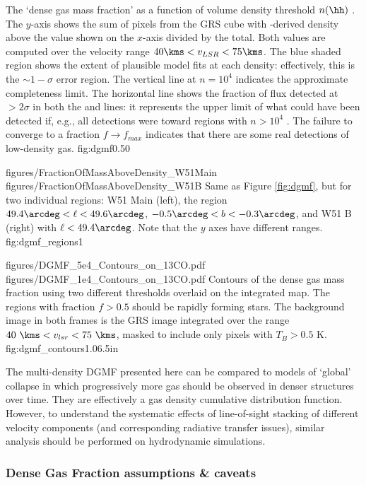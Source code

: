 {The `dense gas mass fraction' as a function of volume density threshold
$n(\hh)$ \percc.  The $y$-axis shows the sum of \thirteenco pixels from the GRS
cube with
\formaldehyde-derived density above the value shown on the $x$-axis divided by
the total.  Both values are computed over the velocity range $40 \kms < v_{LSR}
< 75 \kms$.  The blue shaded region shows the extent of plausible model fits at
each density: effectively, this is the $\sim1-\sigma$ error region.  The
vertical line at $n=10^4$ \percc indicates the approximate completeness limit.
The horizontal line shows the fraction of \thirteenco flux detected at
$>2\sigma$ in both the \oneone and \twotwo lines: it represents the upper limit
of what could have been detected if, e.g., all \formaldehyde detections were
toward regions with $n>10^4$ \percc.  The failure to converge to a fraction
$f\rightarrow f_{max}$ indicates that there are some real detections of
low-density gas.}
{fig:dgmf}{0.5}{0}

\FigureTwo
{figures/FractionOfMassAboveDensity_W51Main}
{figures/FractionOfMassAboveDensity_W51B}
{Same as Figure \ref{fig:dgmf}, but for two individual regions: W51 Main
(left), the region $49.4\arcdeg < \ell < 49.6\arcdeg$, $-0.5\arcdeg < b <
-0.3\arcdeg$, and W51 B (right) with $\ell < 49.4\arcdeg$.  Note
that the $y$ axes have different ranges.}
{fig:dgmf_regions}{1}

\FigureTwoAA
{figures/DGMF_5e4_Contours_on_13CO.pdf}
{figures/DGMF_1e4_Contours_on_13CO.pdf}
{Contours of the dense gas mass fraction using two different thresholds
overlaid on the integrated \thirteenco map.  The regions with fraction $f>0.5$
should be rapidly forming stars.  The background image in both frames is the
GRS \thirteenco image integrated over the range $40~\kms < v_{lsr} < 75~\kms$,
masked to include only pixels with $T_B>0.5$ K.}
{fig:dgmf_contours}{1.0}{6.5in}

The multi-density DGMF presented here can be compared to models of `global'
collapse in which progressively more gas should be observed in denser structures
over time.  They are effectively a gas density cumulative distribution function.
However, to understand the systematic effects of line-of-sight stacking of
different velocity components (and corresponding radiative transfer issues),
similar analysis should be performed on hydrodynamic simulations.

\subsubsection{Dense Gas Fraction assumptions \& caveats}

